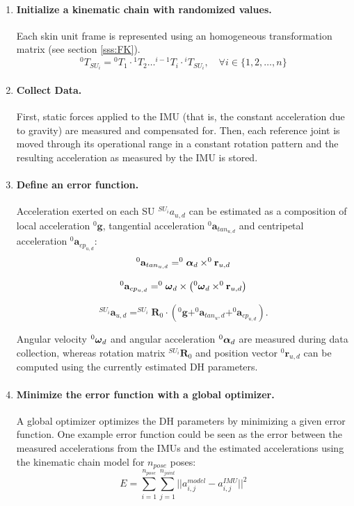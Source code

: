 \begin{enumerate}
    \item \paragraph{Initialize a kinematic chain with randomized values.}
    Each skin unit frame is represented using an homogeneous transformation matrix (see section \ref{sss:FK}).
    $${}^0T_{SU_i} = {}^0T_1 \cdot {}^1T_2 \dots {}^{i-1}T_i \cdot {}^i T_{SU_i}, \quad \forall i \in \{1,2, \dots, n\}$$

    \item \paragraph{Collect Data.}
    First, static forces applied to the IMU (that is, the constant acceleration due to gravity)
    are measured and compensated for.
    Then, each reference joint is moved through its operational range in a constant rotation pattern
    and the resulting acceleration as measured by the IMU is stored.

    \item \paragraph{Define an error function.}
    Acceleration exerted on each SU ${}^{SU_i}a_{u,d}$ can be estimated as a composition of local acceleration $^{0} \mathbf{g}$,
    tangential acceleration $^{0}\mathbf{a}_{t a n_{u, d}}$ and centripetal acceleration $^{0}\mathbf{a}_{cp_{u, d}}$:
    $$^{0}\mathbf{a}_{t a n_{u, d}} = ^{0}\mbox{\boldmath$\alpha$}_{d} \times^{0} \mathbf{r}_{u, d}$$

    $$^{0}\mathbf{a}_{cp_{u, d}} = ^{0}\mbox{\boldmath$\omega$}_{d} \times \left(^{0}\mbox{\boldmath$\omega$}_{d} \times^{0} \mathbf{r}_{u, d}\right)$$

    $$^{SU_{i}}\mathbf{a}_{u, d} = ^{SU_{i}}\mathbf{R}_{0} \cdot\left(^{0} \mathbf{g}+^{0} \mathbf{a}_{t a n_{u}, d}+^{0} \mathbf{a}_{c p_{u, d}}\right).$$

    Angular velocity $^{0}\mbox{\boldmath$\omega$}_{d}$ and angular acceleration $^{0}\mbox{\boldmath$\alpha$}_{d}$ are measured during data collection, whereas rotation matrix $^{SU_{i}}\mathbf{R}_{0}$ and position vector $^{0} \mathbf{r}_{u, d}$ can be computed using the currently estimated DH parameters.

    \item \paragraph{Minimize the error function with a global optimizer.}
    A global optimizer optimizes the DH parameters by minimizing a given error function. One example error function could be seen as the error between the measured accelerations from the IMUs and the estimated accelerations using the kinematic chain model for $n_{pose}$ poses:
    $$E = \sum_{i=1}^{n_{pose}} \sum_{j=1}^{n_{joint}} ||a^{model}_{i,j} - a^{IMU}_{i,j}||^2$$


\end{enumerate}
